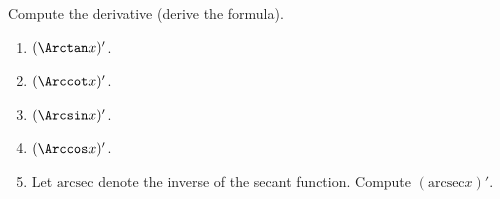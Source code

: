 Compute the derivative (derive the formula).

\begin{multicols}{2}
\begin{enumerate}
\item $(\Arctan x) '$.
\item $(\Arccot x)'$.
\item $(\Arcsin x)'$.
\item $(\Arccos x)'$.
\item Let $\text{arcsec}$ denote the inverse of the secant function. Compute $(\text{arcsec} x)'$.
\end{enumerate}
\end{multicols}